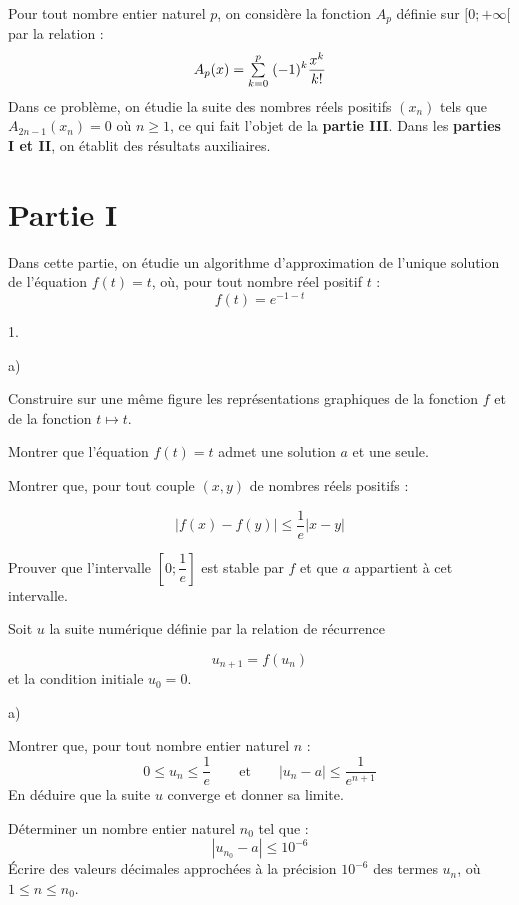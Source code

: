 \documentclass[11pt]{article}%
\begin{document}
\noindent Pour tout nombre entier naturel $p$, on considère la fonction
$A_{p}$ définie sur $[0; + \infty \lbrack $ par la relation : 
\[
A_{p}(x) = {\textstyle\sum\limits_{k = 0}^{p}}\hspace{.1cm}(-1)^{k}\dfrac{x^{k}}{k!}
\]
Dans ce problème, on étudie la suite des nombres réels positifs
$(x_{n})$
tels que $A_{2n-1}(x_{n}) = 0$ où $n\geq 1$, ce qui fait l'objet de la 
\textbf{partie III}. Dans les \textbf{parties I et II}, on établit des
résultats auxiliaires.

\section*{Partie I}

Dans cette partie, on étudie un algorithme d'approximation de l'unique
solution de l'équation $f(t) = t$, où, pour tout nombre réel positif
$t$ : 
\[
f(t) = e^{-1-t}
\]

\begin{noliste}{1.}
 \setlength{\itemsep}{4mm}
\item 

\begin{noliste}{a)}
 \setlength{\itemsep}{2mm}
\item Construire sur une même figure les représentations graphiques de
la
fonction $f$ et de la fonction $t\mapsto t$.

\item Montrer que l'équation $f(t) = t$ admet une solution $a$ et une
seule.

\item Montrer que, pour tout couple $(x,y)$ de nombres réels positifs :

\[
\left| f(x)-f(y)\right| \leq \dfrac{1}{e}\left|
x-y\right|
\]

\item Prouver que l'intervalle $\left[ 0;\dfrac{1}{e}\right] $ est
stable
par $f$ et que $a$ appartient à cet intervalle.
\end{noliste}

\item Soit $u$ la suite numérique définie par la relation de récurrence

\[
u_{n + 1} = f(u_{n})
\]
et la condition initiale $u_{0} = 0$.

\begin{noliste}{a)}
 \setlength{\itemsep}{2mm}
\item Montrer que, pour tout nombre entier naturel $n$ : 
\[
0\leq u_{n}\leq \dfrac{1}{e}\qquad \text{et}\qquad \left|
u_{n}-a\right| \leq \dfrac{1}{e^{n + 1}}
\]
En déduire que la suite $u$ converge et donner sa limite.

\item Déterminer un nombre entier naturel $n_{0}$ tel que : 
\[
\left| u_{n_{0}}-a\right| \leq 10^{-6}
\]
Écrire des valeurs décimales approchées à la précision $10^{-6}$ des
termes $u_{n}$, où $1\leq n\leq n_{0}$.
\end{noliste}
\end{noliste}
\end{document}
